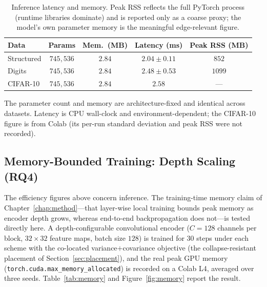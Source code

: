 \begin{table}[htbp]
    \centering
    \caption{Inference latency and memory. Peak RSS reflects the full
    PyTorch process (runtime libraries dominate) and is reported only as a
    coarse proxy; the model's own parameter memory is the meaningful
    edge-relevant figure.}
    \label{tab:efficiency}
    \setlength{\tabcolsep}{9pt}
    \begin{tabular}{lcccc}
        \toprule
        \textbf{Data} & \textbf{Params} & \textbf{Mem.\ (MB)} &
        \textbf{Latency (ms)} & \textbf{Peak RSS (MB)} \\
        \midrule
        Structured & $745{,}536$ & $2.84$ & $2.04 \pm 0.11$ & $852$ \\
        Digits     & $745{,}536$ & $2.84$ & $2.48 \pm 0.53$ & $1099$ \\
        CIFAR-10   & $745{,}536$ & $2.84$ & $2.58$ & --- \\
        \bottomrule
    \end{tabular}
\end{table}
The parameter count and memory are architecture-fixed and identical across
datasets. Latency is CPU wall-clock and environment-dependent; the CIFAR-10
figure is from Colab (its per-run standard deviation and peak RSS were not
recorded).

\subsection{Memory-Bounded Training: Depth Scaling (RQ4)}
\label{sec:memory}
The efficiency figures above concern inference. The training-time memory claim
of Chapter~\ref{chap:method}---that layer-wise local training bounds peak
memory as encoder depth grows, whereas end-to-end backpropagation does
not---is tested directly here. A depth-configurable convolutional encoder
($C = 128$ channels per block, $32 \times 32$ feature maps, batch size $128$)
is trained for $30$ steps under each scheme with the co-located
variance$+$covariance objective (the collapse-resistant placement of
Section~\ref{sec:placement}), and the real peak GPU memory
(\texttt{torch.cuda.max\_memory\_allocated}) is recorded on a Colab L4,
averaged over three seeds. Table~\ref{tab:memory} and Figure~\ref{fig:memory}
report the result.

